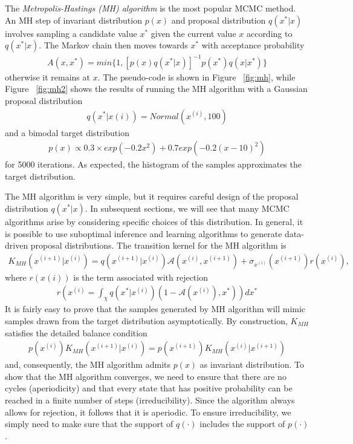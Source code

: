 The \textit{Metropolis-Hastings (MH) algorithm} is the most popular MCMC method. An MH step of invariant distribution $p(x)$ and proposal distribution $q(x^*	| x)$ involves sampling a candidate value $x^*$ given the current value $x$ according to $q(x^* | x)$. The Markov chain then moves towards $x^*$ with acceptance probability
\begin{align*}
  A(x, x^*) = min\{1,[p(x)q(x^* | x)]^{−1} p(x^*)q(x | x^*)\}
\end{align*}
otherwise it remains at $x$. The pseudo-code is shown in Figure ~\ref{fig:mh}, while Figure ~\ref{fig:mh2} shows the results of running the MH algorithm with a Gaussian proposal distribution
\begin{align*}
  q(x^* | x(i)) = Normal(x^{(i)}, 100)
\end{align*}
and a bimodal target distribution
\begin{align*}
  p(x) \propto 0.3 \times exp(−0.2x^2) + 0.7 exp(−0.2{(x - 10)}^2)
\end{align*}
for 5000 iterations. As expected, the histogram of the samples approximates the target distribution.

The MH algorithm is very simple, but it requires careful design of the proposal distribution $q(x^* | x)$. In subsequent sections, we will see that many MCMC algorithms arise by considering specific choices of this distribution. In general, it is possible to use suboptimal inference and learning algorithms to generate data-driven proposal distributions.
The transition kernel for the MH algorithm is
\begin{align*}
  K_{MH}(x^{(i + 1)} | x^{(i)}) = q(x^{(i + 1)} | x^{(i)}) \mathscr{A}(x^{(i)}, x^{(i + 1)}) + \sigma_{x^{(i)}} (x^{(i + 1)}) r (x^{(i)}),
\end{align*}  
where $r(x(i))$ is the term associated with rejection
\begin{align*}
  r(x^{(i)} = \int_{\chi} q(x^* | x^{(i)})(1 - \mathscr{A}(x^{(i)}), x^*))dx^*
\end{align*}
It is fairly easy to prove that the samples generated by MH algorithm will mimic samples
drawn from the target distribution asymptotically. By construction, $K_{MH}$ satisﬁes the detailed
balance condition
\begin{align*}
  p(x^{(i)})K_{MH}(x^{(i + 1)} | x^{(i)}) = p(x^{(i + 1)})K_{MH}(x^{(i)} | x^{(i + 1)})
\end{align*}
and, consequently, the MH algorithm admits $p(x)$ as invariant distribution. To show that the MH algorithm converges, we need to ensure that there are no cycles (aperiodicity)
and that every state that has positive probability can be reached in a ﬁnite number of steps (irreducibility). Since the algorithm always allows for rejection, it follows that it is aperiodic. To ensure irreducibility, we simply need to make sure that the support of $q(\cdotp)$ includes the support of $p(\cdotp)$.

